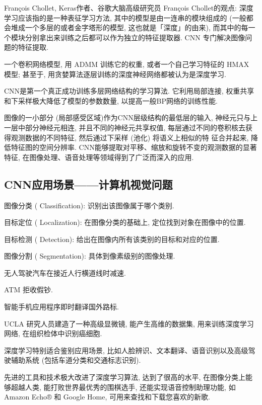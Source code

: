François Chollet, Keras作者、谷歌大脑高级研究员 François Chollet的观点:
深度学习应该指的是一种表征学习方法, 其中的模型是由一连串的模块组成的 (一般都会堆成一个多层的或者金字塔形的模型, 这也就是「深度」的由来),
而其中的每一个模块分别拿出来训练之后都可以作为独立的特征提取器.
CNN 专门解决图像问题的特征提取.
\begin{remark}
    一个卷积网络模型, 用 ADMM 训练它的权重, 或者一个自己学习特征的 HMAX 模型; 甚至于, 用贪婪算法逐层训练的深度神经网络都被认为是深度学习.
\end{remark}

\begin{remark}
    CNN是第一个真正成功训练多层网络结构的学习算法. 它利用局部连接, 权重共享和下采样极大降低了模型的参数数量, 以提高一般BP网络的训练性能.
\end{remark}

图像的一小部分 (局部感受区域)作为CNN层级结构的最低层的输入, 神经元只与上一层中部分神经元相连, 并且不同的神经元共享权值, 每层通过不同的卷积核去获得观测数据的不同特征, 然后通过下采样 (池化) 将语义上相似的特
征合并起来, 降低特征图的空间分辨率.
CNN能够提取对平移、缩放和旋转不变的观测数据的显著特征, 在图像处理、语音处理等领域得到了广泛而深入的应用.
\subsection{CNN应用场景——计算机视觉问题}

\qquad{} 图像分类 ( Classification): 识别出该图像属于哪个类别.

\qquad{} 目标定位 ( Localization): 在图像分类的基础上,  定位找到对象在图像中的位置.

\qquad{} 目标检测 ( Detection): 给出在图像内所有该类别的目标和对应的位置.

\qquad{} 图像分割 ( Segmentation): 具体到像素级别的图像处理.

\qquad{} 无人驾驶汽车在接近人行横道线时减速.

\qquad{} ATM 拒收假钞.

\qquad{} 智能手机应用程序即时翻译国外路标.

\qquad{} UCLA 研究人员建造了一种高级显微镜, 能产生高维的数据集, 用来训练深度学习网络, 在组织检体中识别癌细胞.

深度学习特别适合鉴别应用场景, 比如人脸辨识、文本翻译、语音识别以及高级驾驶辅助系统 (包括车道分类和交通标志识别).

先进的工具和技术极大改进了深度学习算法, 达到了很高的水平, 在图像分类上能够超越人类, 能打败世界最优秀的围棋选手, 还能实现语音控制助理功能, 如 Amazon Echo® 和 Google Home, 可用来查找和下载您喜欢的新歌.

